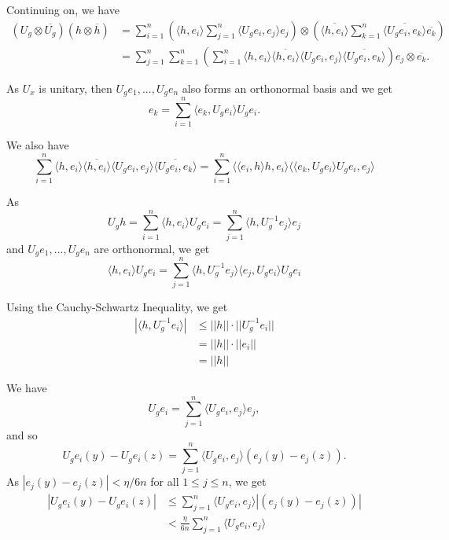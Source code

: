 \documentclass[
  british,
]{article}
\theoremstyle{plain}
\theoremstyle{plain}
\theoremstyle{plain}
\theoremstyle{definition}
\theoremstyle{remark}
\begin{document}
Continuing on, we have \begin{align*}
(U_g\otimes\overline{U_g})(h\otimes\overline{h})&=\sum_{i=1}^n\left(\langle h,e_i \rangle \sum_{j=1}^n \langle U_ge_i,e_j\rangle e_j\right)\otimes\left(\overline{\langle h,e_i \rangle}\sum_{k=1}^n\overline{\langle U_ge_i,e_k\rangle}\overline{e_k}\right)
\\&= \sum_{j=1}^n \sum_{k=1}^n\left(\sum_{i=1}^n\langle h,e_i \rangle \overline{\langle h,e_i \rangle} \langle U_ge_i,e_j\rangle \overline{\langle U_ge_i,e_k\rangle}\right) e_j\otimes\overline{e_k}.
\end{align*}

As \(U_x\) is unitary, then \(U_ge_1,...,U_ge_n\) also forms an
orthonormal basis and we get \[
e_k=\sum_{i=1}^n\langle e_k,U_ge_i\rangle U_ge_i.
\]

We also have \[
\sum_{i=1}^n\langle h,e_i \rangle \overline{\langle h,e_i \rangle} \langle U_ge_i,e_j\rangle \overline{\langle U_ge_i,e_k\rangle}=\sum_{i=1}^n\langle\langle e_i,h \rangle h,e_i \rangle \langle\langle e_k,U_ge_i\rangle U_ge_i,e_j\rangle
\]

As \[
  U_gh=\sum_{i=1}^n \langle h,e_i\rangle U_ge_i=\sum_{j=1}^n \langle h,U_g^{-1}e_j\rangle e_j
\] and \(U_ge_1,...,U_ge_n\) are orthonormal, we get \[
\langle h,e_i\rangle U_ge_i=\sum_{j=1}^n\langle h,U_g^{-1}e_j\rangle \langle e_j,U_ge_i\rangle U_ge_i
\]

Using the Cauchy-Schwartz Inequality, we get \begin{align*}
|\langle h,U_g^{-1}e_i\rangle|&\leq ||h||\cdot||U_g^{-1}e_i||
\\& = ||h||\cdot ||e_i||
\\& = ||h||
\end{align*}

We have \[
U_ge_i=\sum_{j=1}^n \langle U_ge_i,e_j\rangle e_j,
\] and so \[
U_ge_i(y)-U_ge_i(z)=\sum_{j=1}^n \langle U_ge_i,e_j\rangle (e_j(y)-e_j(z)).
\] As \(|e_j(y)-e_j(z)|<\eta/6n\) for all \(1\leq j\leq n\), we get
\begin{align*}
|U_ge_i(y)-U_ge_i(z)|&\leq \sum_{j=1}^n \langle U_ge_i,e_j\rangle |(e_j(y)-e_j(z))|
\\&<\frac{\eta}{6n}\sum_{j=1}^n \langle U_ge_i,e_j\rangle
\end{align*}
\end{document}
